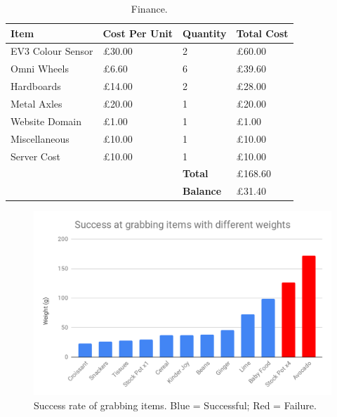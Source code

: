 \documentclass[a4paper]{article}
\begin{document}
\begin{center}
\begin{table}[H]
\centering
\begin{tabular}{| p{2.5cm} | p{1.5cm} | p{1.5cm} | p{2cm} |}
\hline
\textbf{Item} & \textbf{Cost Per Unit} & \textbf{Quantity} & \textbf{Total Cost} \\
\hline
EV3 Colour Sensor & £30.00 & 2 & £60.00 \\
\hline
Omni Wheels & £6.60 & 6 & £39.60 \\
\hline
Hardboards & £14.00 & 2 & £28.00 \\
\hline
Metal Axles & £20.00 & 1 & £20.00 \\
\hline
Website Domain & £1.00 & 1 & £1.00 \\
\hline
Miscellaneous & £10.00 & 1 & £10.00 \\
\hline
Server Cost & £10.00 & 1 & £10.00 \\ 
\hline
 &  & \textbf{Total} & £168.60 \\ 
\hline
 &  & \textbf{Balance} & £31.40 \\
\hline
\end{tabular}
\caption{Finance.}
\end{table}

\begin{figure}[H]
  \includegraphics[width=\linewidth]{grab-rate.png}
  \caption{Success rate of grabbing items. Blue = Successful; Red = Failure.}\label{fig:awesome_image1}
\endminipage
\newline
\end{figure}


\end{center}
\end{document}
